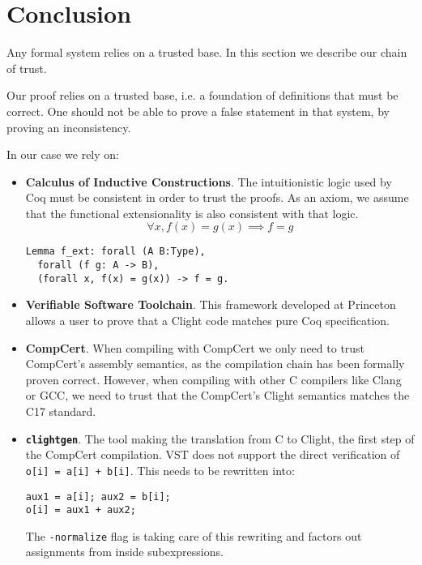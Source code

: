 \section{Conclusion}
\label{sec:Conclusion}

Any formal system relies on a trusted base. In this section we describe our
chain of trust.

Our proof relies on a trusted base, i.e. a foundation of definitions that must be
correct. One should not be able to prove a false statement in that system, \eg by
proving an inconsistency.

In our case we rely on:
\begin{itemize}
  \item \textbf{Calculus of Inductive Constructions}. The intuitionistic logic
        used by Coq must be consistent in order to trust the proofs. As an axiom,
        we assume that the functional extensionality is also consistent with that logic.
        $$\forall x, f(x) = g(x) \implies f = g$$
        \begin{lstlisting}[language=Coq,belowskip=-0.25 \baselineskip]
Lemma f_ext: forall (A B:Type),
  forall (f g: A -> B),
  (forall x, f(x) = g(x)) -> f = g.
\end{lstlisting}

  \item \textbf{Verifiable Software Toolchain}. This framework developed at
        Princeton allows a user to prove that a Clight code matches pure Coq
        specification.

  \item \textbf{CompCert}. When compiling with CompCert we only need to trust
        CompCert's {assembly} semantics, as the compilation chain has been formally proven correct.
        However, when compiling with other C compilers like Clang or GCC, we need to
        trust that the CompCert's Clight semantics matches the C17 standard.

  \item \textbf{\texttt{clightgen}}. The tool making the translation from {C} to
          {Clight}, the first step of the CompCert compilation.
        VST does not support the direct verification of \texttt{o[i] = a[i] + b[i]}.
        This needs to be rewritten into:
        \begin{lstlisting}[language=Ctweetnacl,stepnumber=0,belowskip=-0.5 \baselineskip]
aux1 = a[i]; aux2 = b[i];
o[i] = aux1 + aux2;
\end{lstlisting}
        The \texttt{-normalize} flag is taking care of this
        rewriting and factors out assignments from inside subexpressions.


\end{itemize}
